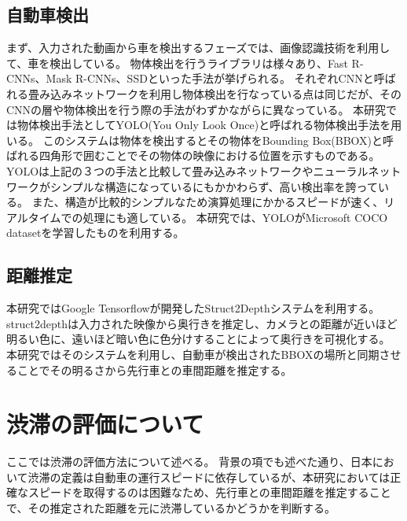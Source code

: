 \subsection{自動車検出}
まず、入力された動画から車を検出するフェーズでは、画像認識技術を利用して、車を検出している。
物体検出を行うライブラリは様々あり、Fast R-CNNs、Mask R-CNNs、SSDといった手法が挙げられる。
それぞれCNNと呼ばれる畳み込みネットワークを利用し物体検出を行なっている点は同じだが、そのCNNの層や物体検出を行う際の手法がわずかながらに異なっている。
本研究では物体検出手法としてYOLO(You Only Look Once)と呼ばれる物体検出手法を用いる。
このシステムは物体を検出するとその物体をBounding Box(BBOX)と呼ばれる四角形で囲むことでその物体の映像における位置を示すものである。
YOLOは上記の３つの手法と比較して畳み込みネットワークやニューラルネットワークがシンプルな構造になっているにもかかわらず、高い検出率を誇っている。
また、構造が比較的シンプルなため演算処理にかかるスピードが速く、リアルタイムでの処理にも適している。
本研究では、YOLOがMicrosoft COCO datasetを学習したものを利用する。

\subsection{距離推定}
本研究ではGoogle Tensorflowが開発したStruct2Depthシステムを利用する。
struct2depthは入力された映像から奥行きを推定し、カメラとの距離が近いほど明るい色に、遠いほど暗い色に色分けすることによって奥行きを可視化する。
本研究ではそのシステムを利用し、自動車が検出されたBBOXの場所と同期させることでその明るさから先行車との車間距離を推定する。

\section{渋滞の評価について}
ここでは渋滞の評価方法について述べる。
背景の項でも述べた通り、日本において渋滞の定義は自動車の運行スピードに依存しているが、本研究においては正確なスピードを取得するのは困難なため、先行車との車間距離を推定することで、その推定された距離を元に渋滞しているかどうかを判断する。

